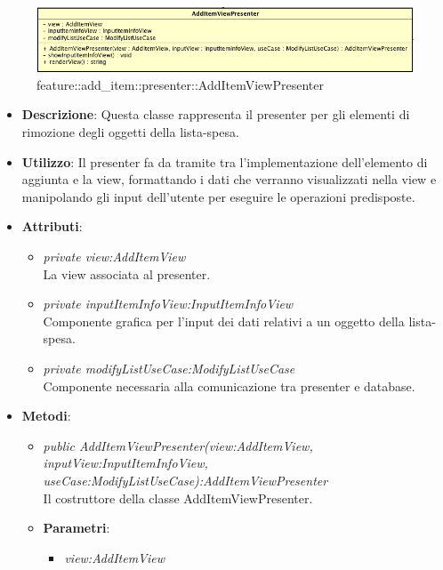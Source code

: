 \label{feature::add_item::presenter::AddItemViewPresenter}
\begin{figure}[H]
	\centering
	\includegraphics[scale=0.5]{Sezioni/SottosezioniST/img/app/AddItemViewPresenter.png}
	\caption{feature::add\_item::presenter::AddItemViewPresenter}
\end{figure}

\begin{itemize}
\item \textbf{Descrizione}: Questa classe rappresenta il presenter per gli elementi di rimozione degli oggetti  della lista-spesa.
\item \textbf{Utilizzo}: Il presenter fa da tramite tra l'implementazione dell'elemento di aggiunta e la view, formattando i dati che verranno visualizzati nella view e manipolando gli input dell'utente per eseguire le operazioni predisposte.
\item \textbf{Attributi}: 
	\begin{itemize}
	\item \textit{private view:AddItemView}\\
	La view associata al presenter.
	\item \textit{private inputItemInfoView:InputItemInfoView}\\
	Componente grafica per l'input dei dati relativi a un oggetto della lista-spesa.
	\item \textit{private modifyListUseCase:ModifyListUseCase}\\
	Componente necessaria alla comunicazione tra presenter e database.
	\end{itemize}
\item \textbf{Metodi}:
	\begin{itemize}
	\item \textit{public AddItemViewPresenter(view:AddItemView, inputView:InputItemInfoView, \\ useCase:ModifyListUseCase):AddItemViewPresenter}\\
	Il costruttore della classe AddItemViewPresenter.	
		\item{\textbf{Parametri}: \begin{itemize}
		\item \textit{view:AddItemView}\\

\end{itemize}}
\end{itemize}
\end{itemize}
